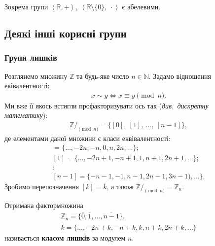 \documentclass{math_library}
\begin{document}
\begin{example}
Зокрема групи $\left< \mathbb{R},+ \right>,\ \left< \mathbb{R} \setminus \{0\},\ \cdot \right>$ є абелевими.
\end{example}

\subsection{Деякі інші корисні групи}
\subsubsection{Групи лишків}
Розглянемо множину $\mathbb{Z}$ та будь-яке число $n \in \mathbb{N}$. Задамо відношення еківалентності:
\begin{align*}
x \sim y \iff x \equiv y \pmod n.
\end{align*}
Ми вже її якось встигли профакторизувати ось так (\textit{див.~дискретну математику}):
\begin{align*}
\mathbb{Z}/_{\!\!\pmod n} = \{[0],\ [1],\ \dots,\ [n-1] \},
\end{align*}
де елементами даної множини є класи еквівалентності:
\begin{align*}
[0] = \{\dots,-2n,-n,0,n,2n,\dots\}; \\
[1] = \{\dots, -2n+1,-n+1,1,n+1,2n+1,\dots\}; \\
\vdots \\
[n-1] = \{-n-1,-1,n-1,2n-1,3n-1),\dots\}.
\end{align*}
Зробимо перепозначення $[k] = \overline{k}$, а також $\mathbb{Z}/_{\!\!\pmod n} = \mathbb{Z}_n$.
\begin{definition}
Отримана фактормножина
\begin{align*}
\mathbb{Z}_n = \{\overline{0}, \overline{1}, \dots, \overline{n-1} \}, \\
\overline{k} = \{\dots,-2n+k,-n+k,k,n+k,2n+k,\dots\}
\end{align*}
називається \textbf{класом лишків} за модулем $n$.
\end{definition}
\end{document}
